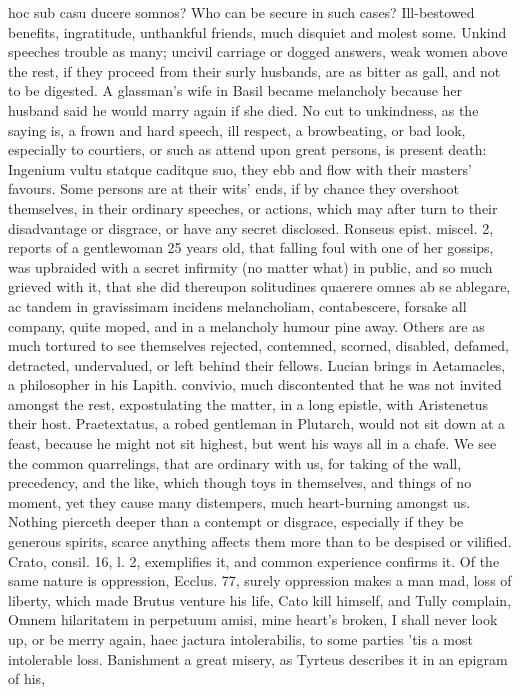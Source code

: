 {hoc sub casu ducere somnos? Who can be secure in such cases?
Ill-bestowed benefits, ingratitude, unthankful friends, much disquiet
and molest some. Unkind speeches trouble as many; uncivil carriage or
dogged answers, weak women above the rest, if they proceed from their
surly husbands, are as bitter as gall, and not to be digested. A
glassman's wife in Basil became melancholy because her husband said he
would marry again if she died. No cut to unkindness, as the saying is,
a frown and hard speech, ill respect, a browbeating, or bad look,
especially to courtiers, or such as attend upon great persons, is
present death: Ingenium vultu statque caditque suo, they ebb and flow
with their masters' favours. Some persons are at their wits' ends, if
by chance they overshoot themselves, in their ordinary speeches, or
actions, which may after turn to their disadvantage or disgrace, or
have any secret disclosed. Ronseus epist. miscel. 2, reports of a
gentlewoman 25 years old, that falling foul with one of her gossips,
was upbraided with a secret infirmity (no matter what) in public, and
so much grieved with it, that she did thereupon solitudines quaerere
omnes ab se ablegare, ac tandem in gravissimam incidens melancholiam,
contabescere, forsake all company, quite moped, and in a melancholy
humour pine away. Others are as much tortured to see themselves
rejected, contemned, scorned, disabled, defamed, detracted,
undervalued, or left behind their fellows. Lucian brings in
Aetamacles, a philosopher in his Lapith. convivio, much discontented
that he was not invited amongst the rest, expostulating the matter, in
a long epistle, with Aristenetus their host. Praetextatus, a robed
gentleman in Plutarch, would not sit down at a feast, because he might
not sit highest, but went his ways all in a chafe. We see the common
quarrelings, that are ordinary with us, for taking of the wall,
precedency, and the like, which though toys in themselves, and things
of no moment, yet they cause many distempers, much heart-burning
amongst us. Nothing pierceth deeper than a contempt or disgrace,
especially if they be generous spirits, scarce anything affects
them more than to be despised or vilified. Crato, consil. 16, l. 2,
exemplifies it, and common experience confirms it. Of the same nature
is oppression, Ecclus. 77, surely oppression makes a man mad, loss of
liberty, which made Brutus venture his life, Cato kill himself, and
Tully complain, Omnem hilaritatem in perpetuum amisi, mine
heart's broken, I shall never look up, or be merry again, haec
jactura intolerabilis, to some parties 'tis a most intolerable loss.
Banishment a great misery, as Tyrteus describes it in an epigram of
his,

}
